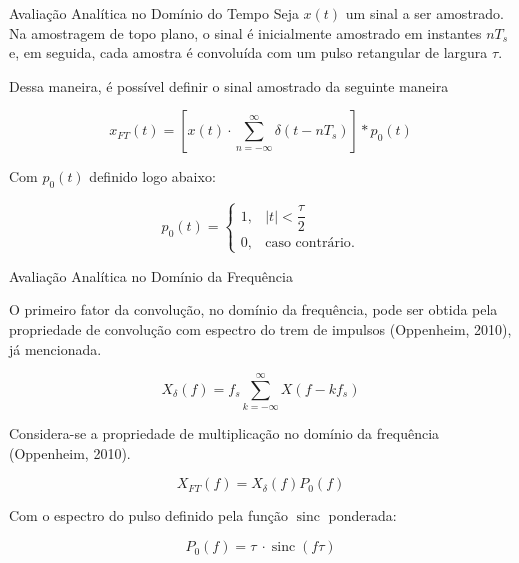 \documentclass{beamer}
\begin{document}
\begin{frame}{Avaliação Analítica no Domínio do Tempo}
    Seja $x(t)$ um sinal a ser amostrado. Na amostragem de topo plano, o sinal é inicialmente amostrado em instantes $nT_s$ e, em seguida, cada amostra é convoluída com um pulso retangular de largura $\tau$.

    Dessa maneira, é possível definir o sinal amostrado da seguinte maneira

    \begin{equation}
        x_{FT}(t)=[x(t) \cdot \displaystyle\sum_{n=-\infty}^{\infty}\delta(t-nT_s)]*p_0(t)
    \end{equation}

    Com $p_0(t)$ definido logo abaixo:
    
    \begin{equation}
        p_0(t)=\begin{cases}
        1, & |t|<\dfrac{\tau}{2}\\0, & \text{caso contrário}.
        \end{cases}
    \end{equation}
\end{frame}

\begin{frame}{Avaliação Analítica no Domínio da Frequência}

O primeiro fator da convolução, no domínio da frequência, pode ser obtida pela propriedade de convolução com espectro do trem de impulsos (Oppenheim, 2010), já mencionada.

\begin{equation}
    X_{\delta}(f)=f_s\sum_{k=-\infty}^{\infty}X(f-kf_s)
\end{equation}

Considera-se a propriedade de multiplicação no domínio da frequência (Oppenheim, 2010).

\begin{equation}
    X_{FT}(f) = X_{\delta}(f)P_0(f)
\end{equation}

Com o espectro do pulso definido pela função $\operatorname{sinc}$ ponderada:

\begin{equation}
   P_0(f)=\tau\ \cdot \operatorname{sinc}(f\tau)
\end{equation}
    
\end{frame}
\end{document}
